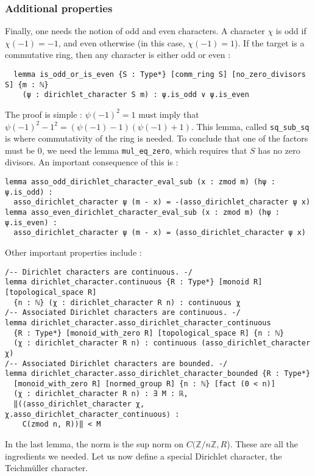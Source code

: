 \documentclass[a4paper,UKenglish,cleveref, autoref, thm-restate]{lipics-v2021}
\newcommand{\lean}[1]{\texttt{#1}\xspace} %
\begin{document}
\subsubsection{Additional properties}
Finally, one needs the notion of odd and even characters. A character $\chi$ is odd if $\chi (-1) = -1$, and 
even otherwise (in this case, $\chi (-1) = 1$). If the target is a commutative ring, then any character is 
either odd or even : 
\begin{lstlisting}
  lemma is_odd_or_is_even {S : Type*} [comm_ring S] [no_zero_divisors S] {m : ℕ} 
    (ψ : dirichlet_character S m) : ψ.is_odd ∨ ψ.is_even
\end{lstlisting}
The proof is simple : $\psi (-1)^2 = 1$ must imply that $\psi(-1)^2 - 1^2 = (\psi(-1) - 1)(\psi(-1) + 1)$. 
This lemma, called \lean{sq\_sub\_sq} is where commutativity of the ring is needed. To conclude that one 
of the factors must be 0, we need the lemma \lean{mul\_eq\_zero}, which requires that $S$ has no zero divisors. 
An important consequence of this is : 
\begin{lstlisting}
lemma asso_odd_dirichlet_character_eval_sub (x : zmod m) (hψ : ψ.is_odd) :
  asso_dirichlet_character ψ (m - x) = -(asso_dirichlet_character ψ x)
lemma asso_even_dirichlet_character_eval_sub (x : zmod m) (hψ : ψ.is_even) :
  asso_dirichlet_character ψ (m - x) = (asso_dirichlet_character ψ x)
\end{lstlisting}

Other important properties include : 
\begin{lstlisting}
/-- Dirichlet characters are continuous. -/
lemma dirichlet_character.continuous {R : Type*} [monoid R] [topological_space R]
  {n : ℕ} (χ : dirichlet_character R n) : continuous χ
/-- Associated Dirichlet characters are continuous. -/
lemma dirichlet_character.asso_dirichlet_character_continuous
  {R : Type*} [monoid_with_zero R] [topological_space R] {n : ℕ} 
  (χ : dirichlet_character R n) : continuous (asso_dirichlet_character χ) 
/-- Associated Dirichlet characters are bounded. -/
lemma dirichlet_character.asso_dirichlet_character_bounded {R : Type*} 
  [monoid_with_zero R] [normed_group R] {n : ℕ} [fact (0 < n)] 
  (χ : dirichlet_character R n) : ∃ M : ℝ,
  ‖(⟨asso_dirichlet_character χ, χ.asso_dirichlet_character_continuous⟩ : 
    C(zmod n, R))‖ < M 
\end{lstlisting}

In the last lemma, the norm is the sup norm on $C(\mathbb{Z}/n \mathbb{Z}, R$). 
These are all the ingredients we needed. Let us now define a special Dirichlet character, the Teichmüller character.
\end{document}
